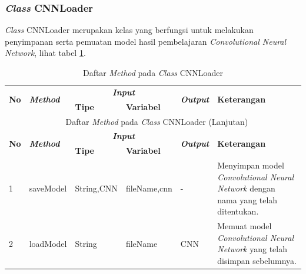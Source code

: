 \subsubsection{\textit{Class} CNNLoader}
\noindent \textit{Class} CNNLoader merupakan kelas yang berfungsi untuk melakukan penyimpanan serta pemuatan model hasil pembelajaran \textit{Convolutional Neural Network}, lihat tabel \ref{tbl:classCNNLoader}.
\begingroup
\setlength{\LTleft}{-20cm plus -1fill}
\setlength{\LTright}{\LTleft}
\begin{small}
\begin{longtable}{|p{0.4cm}|p{2cm}|p{1.8cm}|p{1.8cm}|p{1.7cm}|p{3.55cm}|}
	\caption{Daftar \textit{Method} pada \textit{Class} CNNLoader \label{tbl:classCNNLoader}}\\
	\hline
	\multirow{2}{*}{\textbf{No}} & \multirow{2}{*}{\textit{\textbf{Method}}} & \multicolumn{2}{c|}{\textit{\textbf{Input}}} & \multirow{2}{*}{\textit{\textbf{Output}}} & 
	\multirow{2}{*}{\textbf{Keterangan}}\\
	\cline{3-4}
	& & \textbf{Tipe} & \textbf{Variabel} & & \\
	\endfirsthead
	\multicolumn{6}{c}{\textbf{\tablename~\thetable} Daftar \textit{Method} pada \textit{Class} CNNLoader (Lanjutan)} \\
	\hline
	\multirow{2}{*}{\textbf{No}} & \multirow{2}{*}{\textit{\textbf{Method}}} & \multicolumn{2}{c|}{\textit{\textbf{Input}}} & \multirow{2}{*}{\textit{\textbf{Output}}} & 
	\multirow{2}{*}{\textbf{Keterangan}}\\
	\cline{3-4}
	& & \textbf{Tipe} & \textbf{Variabel} & & \\
	\endhead
	\hline
	1 & saveModel & String,\newline CNN & fileName,\newline cnn & - & Menyimpan model \textit{Convolutional Neural Network} dengan nama yang telah ditentukan.\\
	\hline
	2 & loadModel & String & fileName & CNN & Memuat model \textit{Convolutional Neural Network} yang telah disimpan sebelumnya.\\
	\hline
\end{longtable}
\end{small}
\endgroup

